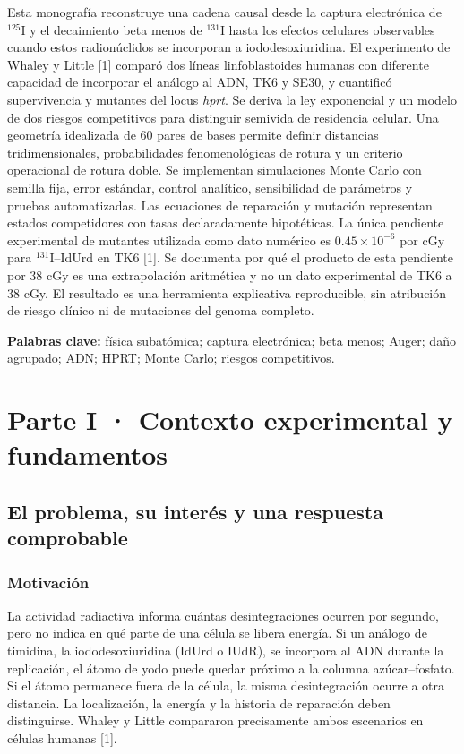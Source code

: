 \documentclass[11pt,a4paper,oneside]{article}
\begin{document}
Esta monografía reconstruye una cadena causal desde la captura electrónica de \(^{125}\)I y el decaimiento beta menos de \(^{131}\)I hasta los efectos celulares observables cuando estos radionúclidos se incorporan a iododesoxiuridina. El experimento de Whaley y Little {[}1{]} comparó dos líneas linfoblastoides humanas con diferente capacidad de incorporar el análogo al ADN, TK6 y SE30, y cuantificó supervivencia y mutantes del locus \emph{hprt}. Se deriva la ley exponencial y un modelo de dos riesgos competitivos para distinguir semivida de residencia celular. Una geometría idealizada de 60 pares de bases permite definir distancias tridimensionales, probabilidades fenomenológicas de rotura y un criterio operacional de rotura doble. Se implementan simulaciones Monte Carlo con semilla fija, error estándar, control analítico, sensibilidad de parámetros y pruebas automatizadas. Las ecuaciones de reparación y mutación representan estados competidores con tasas declaradamente hipotéticas. La única pendiente experimental de mutantes utilizada como dato numérico es \(0.45\times10^{-6}\) por cGy para \(^{131}\)I--IdUrd en TK6 {[}1{]}. Se documenta por qué el producto de esta pendiente por 38 cGy es una extrapolación aritmética y no un dato experimental de TK6 a 38 cGy. El resultado es una herramienta explicativa reproducible, sin atribución de riesgo clínico ni de mutaciones del genoma completo.

\textbf{Palabras clave:} física subatómica; captura electrónica; beta menos; Auger; daño agrupado; ADN; HPRT; Monte Carlo; riesgos competitivos.

\section{Parte I · Contexto experimental y fundamentos}\label{parte-i-contexto-experimental-y-fundamentos}

\subsection{El problema, su interés y una respuesta comprobable}\label{el-problema-su-interuxe9s-y-una-respuesta-comprobable}

\subsubsection{Motivación}\label{motivaciuxf3n}

La actividad radiactiva informa cuántas desintegraciones ocurren por segundo, pero no indica en qué parte de una célula se libera energía. Si un análogo de timidina, la iododesoxiuridina (IdUrd o IUdR), se incorpora al ADN durante la replicación, el átomo de yodo puede quedar próximo a la columna azúcar--fosfato. Si el átomo permanece fuera de la célula, la misma desintegración ocurre a otra distancia. La localización, la energía y la historia de reparación deben distinguirse. Whaley y Little compararon precisamente ambos escenarios en células humanas {[}1{]}.
\end{document}
